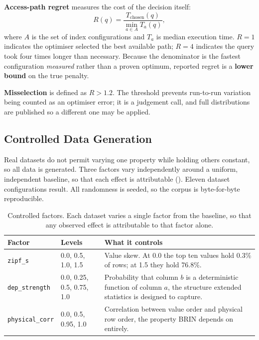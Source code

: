 \documentclass[12pt, a4paper]{article}
\begin{document}
\textbf{Access-path regret} measures the cost of the decision itself:
\begin{equation}
R(q) = \frac{T_{\mathrm{chosen}}(q)}{\min_{a \in A} T_a(q)},
\label{eq:regret}
\end{equation}
where $A$ is the set of index configurations and $T_a$ is median
execution time. $R = 1$ indicates the optimiser selected the best
available path; $R = 4$ indicates the query took four times longer than
necessary. Because the denominator is the fastest configuration
\emph{measured} rather than a proven optimum, reported regret is a
\textbf{lower bound} on the true penalty.

\textbf{Misselection} is defined as $R > 1.2$. The threshold prevents
run-to-run variation being counted as an optimiser error; it is a
judgement call, and full distributions are published so a different one
may be applied.

\subsection{Controlled Data Generation}

Real datasets do not permit varying one property while holding others
constant, so all data is generated. Three factors vary independently
around a uniform, independent baseline, so that each effect is
attributable (). Eleven dataset configurations result.
All randomness is seeded, so the corpus is byte-for-byte reproducible.

\begin{table}[htbp]
\centering
\caption{Controlled factors. Each dataset varies a single factor from
the baseline, so that any observed effect is attributable to that
factor alone.}
\label{tab:factors}
\small
\begin{tabular}{@{}p{2.6cm}p{3.4cm}p{7.4cm}@{}}
\toprule
\textbf{Factor} & \textbf{Levels} & \textbf{What it controls} \\
\midrule
\texttt{zipf\_s} & 0.0, 0.5, 1.0, 1.5 & Value skew. At 0.0 the top ten values hold 0.3\% of rows; at 1.5 they hold 76.8\%. \\
\texttt{dep\_strength} & 0.0, 0.25, 0.5, 0.75, 1.0 & Probability that column $b$ is a deterministic function of column $a$, the structure extended statistics is designed to capture. \\
\texttt{physical\_corr} & 0.0, 0.5, 0.95, 1.0 & Correlation between value order and physical row order, the property BRIN depends on entirely. \\
\bottomrule
\end{tabular}
\end{table}
\end{document}
